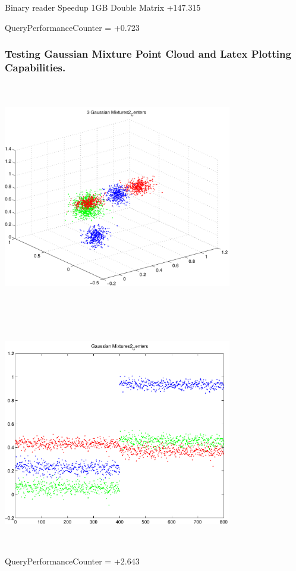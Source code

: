 \documentclass[9pt]{article}
\theoremstyle{plain}
\theoremstyle{definition}
\theoremstyle{remark}
\numberwithin{equation}{section}
\begin{document}
Binary reader Speedup 1GB Double Matrix +147.315

QueryPerformanceCounter  =  +0.723
\subsubsection{Testing Gaussian Mixture Point Cloud and Latex Plotting Capabilities.}
\includegraphics[width=10.0cm,height=10.0cm]{GaussianMixture_Dim_3_Centers2.pdf}

\includegraphics[width=10.0cm,height=10.0cm]{GaussianMixture_Dim_1_Centers2.pdf}

QueryPerformanceCounter  =  +2.643
\end{document}
